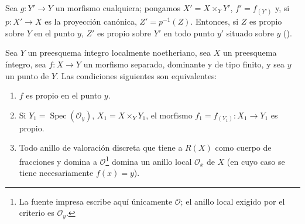 Sea $g:Y'\to Y$ un morfismo cualquiera; pongamos $X'=X\times_Y Y'$, $f'=f_{(Y')}$ y, si $p:X'\to X$ es la proyección canónica, $Z'=p^{-1}(Z)$.
Entonces, si $Z$ es propio sobre $Y$ en el punto $y$, $Z'$ es propio sobre $Y'$ en todo punto $y'$ situado sobre $y$ ().

\begin{proposition}[15.7.2]
\label{IV.15.7.2}
Sea $Y$ un preesquema íntegro localmente noetheriano, sea $X$ un preesquema íntegro, sea $f:X\to Y$ un morfismo separado, dominante y de tipo finito, y sea $y$ un punto de $Y$.
Las condiciones siguientes son equivalentes:
\begin{enumerate}[label=\emph{\alph*)}]
  \item $f$ es propio en el punto $y$.
  \item Si $Y_1=\operatorname{Spec}(\mathcal O_y)$, $X_1=X\times_Y Y_1$, el morfismo $f_1=f_{(Y_1)}:X_1\to Y_1$ es propio.
  \item Todo anillo de valoración discreta que tiene a $R(X)$ como cuerpo de fracciones y domina a $\mathcal O$\footnote{La fuente impresa escribe aquí únicamente $\mathcal O$; el anillo local exigido por el criterio es $\mathcal O_y$.} domina un anillo local $\mathcal O_x$ de $X$ \textup{(en cuyo caso se tiene necesariamente $f(x)=y$)}.
\end{enumerate}
\end{proposition}

